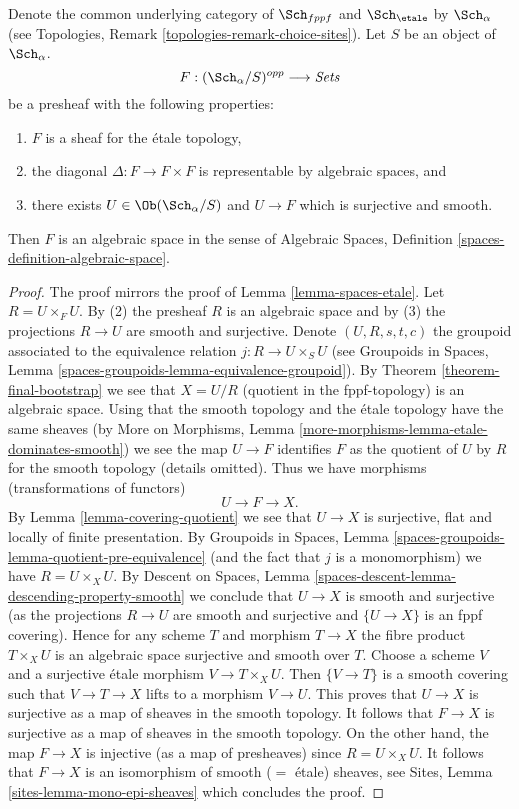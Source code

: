 \begin{lemma}
\label{lemma-spaces-etale-smooth-cover}
Denote the common underlying category of $\Sch_{fppf}$
and $\Sch_\etale$ by $\Sch_\alpha$ (see
Topologies, Remark \ref{topologies-remark-choice-sites}). Let $S$ be an object
of $\Sch_\alpha$. 
$$
F : (\Sch_\alpha/S)^{opp} \longrightarrow \textit{Sets}
$$
be a presheaf with the following properties:
\begin{enumerate}
\item $F$ is a sheaf for the \'etale topology,
\item the diagonal $\Delta : F \to F \times F$ is representable
by algebraic spaces, and
\item there exists $U \in \Ob(\Sch_\alpha/S)$
and $U \to F$ which is surjective and smooth.
\end{enumerate}
Then $F$ is an algebraic space in the sense of
Algebraic Spaces, Definition \ref{spaces-definition-algebraic-space}.
\end{lemma}

\begin{proof}
The proof mirrors the proof of Lemma \ref{lemma-spaces-etale}. Let
$R = U \times_F U$. By (2) the presheaf $R$ is an algebraic space and by (3)
the projections $R \to U$ are smooth and surjective. Denote $(U, R, s, t, c)$
the groupoid associated to the equivalence relation $j : R \to U \times_S U$
(see Groupoids in Spaces, Lemma
\ref{spaces-groupoids-lemma-equivalence-groupoid}).
By Theorem \ref{theorem-final-bootstrap} we see that $X = U/R$ (quotient
in the fppf-topology) is an algebraic space. Using that the smooth
topology and the \'etale topology have the same sheaves (by
More on Morphisms, Lemma \ref{more-morphisms-lemma-etale-dominates-smooth})
we see the map $U \to F$ identifies $F$ as the quotient of
$U$ by $R$ for the smooth topology (details omitted).
Thus we have morphisms (transformations of functors)
$$
U \to F \to X.
$$
By Lemma \ref{lemma-covering-quotient} we see that $U \to X$ is
surjective, flat and locally of finite presentation. By
Groupoids in Spaces, Lemma
\ref{spaces-groupoids-lemma-quotient-pre-equivalence}
(and the fact that $j$ is a monomorphism) we have $R = U \times_X U$. By
Descent on Spaces, Lemma \ref{spaces-descent-lemma-descending-property-smooth}
we conclude that $U \to X$ is smooth and surjective (as the projections
$R \to U$ are smooth and surjective and $\{U \to X\}$ is an fppf
covering). Hence for any scheme $T$ and morphism $T \to X$ the fibre product
$T \times_X U$ is an algebraic space surjective and smooth over $T$.
Choose a scheme $V$ and a surjective \'etale morphism $V \to T \times_X U$.
Then $\{V \to T\}$ is a smooth covering such that $V \to T \to X$
lifts to a morphism $V \to U$. This proves that
$U \to X$ is surjective as a map of sheaves in the smooth topology.
It follows that $F \to X$ is surjective as a map of sheaves in the smooth
topology. On the other hand, the map $F \to X$ is injective (as a map
of presheaves) since $R = U \times_X U$.
It follows that $F \to X$ is an isomorphism of smooth ($=$ \'etale)
sheaves, see Sites, Lemma \ref{sites-lemma-mono-epi-sheaves}
which concludes the proof.
\end{proof}













